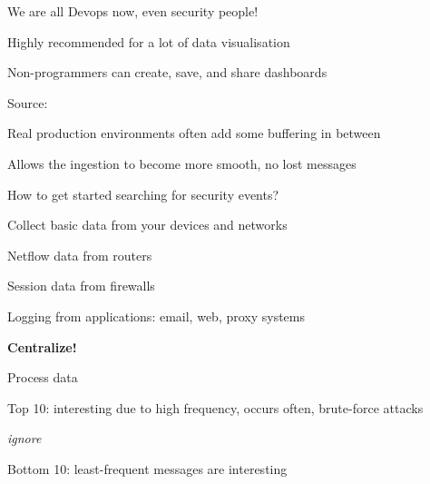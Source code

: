 \documentclass[Screen16to9,17pt]{foils}
\begin{document}

\vskip 1cm
\centerline{We are all Devops now, even security people!}




\centerline{Highly recommended for a lot of data visualisation}

Non-programmers can create, save, and share dashboards

Source:



\begin{list2}
\item Real production environments often add some buffering in between
\item Allows the ingestion to become more smooth, no lost messages
\end{list2}




\begin{list1}
\item How to get started searching for security events?
\item Collect basic data from your devices and networks
\begin{list2}
\item Netflow data from routers
\item Session data from firewalls
\item Logging from applications: email, web, proxy systems
\end{list2}
\item {\bf Centralize!}
\item Process data
\begin{list2}
\item Top 10: interesting due to high frequency, occurs often, brute-force attacks
\item {\it ignore}
\item Bottom 10: least-frequent messages are interesting
\end{list2}
\end{list1}




\end{document}
